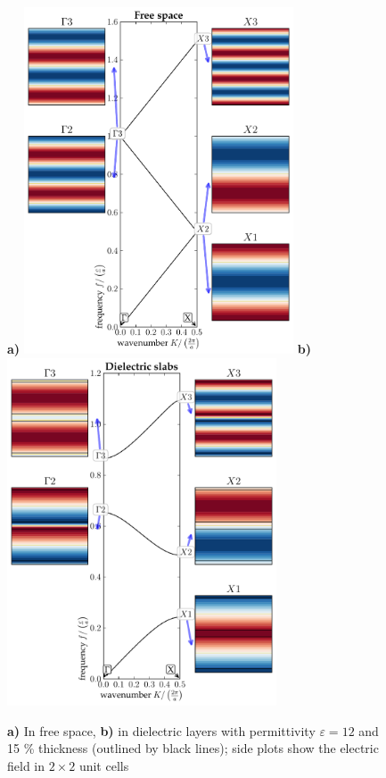 \begin{figure}[ht] \caption{ \textbf{a)} In free space, \textbf{b)} in dielectric layers with permittivity $\varepsilon = 12$ and 15 \% thickness (outlined by black lines); side plots show the electric field in $2\times 2$ unit cells} \label{fg_1dbd} \centering 
\textbf{a)}	\includegraphics[width=8cm]{img/Slab_eps001_PWEM.pdf}
\textbf{b)}	\includegraphics[width=8cm]{img/Slab_eps012_d15.pdf}
\end{figure}

